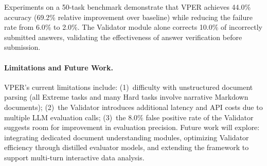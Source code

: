 \documentclass{article}
\begin{document}
Experiments on a 50-task benchmark demonstrate that VPER achieves 44.0\% accuracy (69.2\% relative improvement over baseline) while reducing the failure rate from 6.0\% to 2.0\%.
The Validator module alone corrects 10.0\% of incorrectly submitted answers, validating the effectiveness of answer verification before submission.

\paragraph{Limitations and Future Work.}
VPER's current limitations include: (1)~difficulty with unstructured document parsing (all Extreme tasks and many Hard tasks involve narrative Markdown documents); (2)~the Validator introduces additional latency and API costs due to multiple LLM evaluation calls; (3)~the 8.0\% false positive rate of the Validator suggests room for improvement in evaluation precision.
Future work will explore: integrating dedicated document understanding modules, optimizing Validator efficiency through distilled evaluator models, and extending the framework to support multi-turn interactive data analysis.




\end{document}
